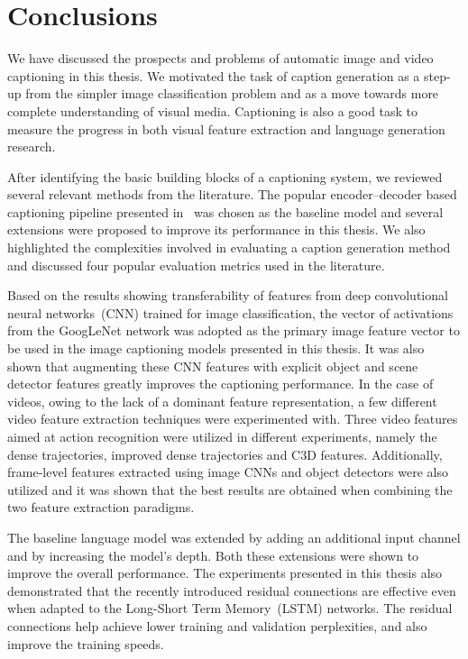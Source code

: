 \chapter{Conclusions}
\label{chapter:conclusions}

We have discussed the prospects and problems of automatic image and video
captioning in this thesis.
%
We motivated the task of caption generation as a step-up from the simpler image
classification problem and as a move towards more complete understanding of
visual media.
Captioning is also a good task to measure the progress in both visual feature
extraction and language generation research.

After identifying the basic building blocks of a captioning system, we reviewed
several relevant methods from the literature.
The popular encoder--decoder based captioning pipeline presented
in~\cite{Vinyals_2015_CVPR} was chosen as the baseline model and several
extensions were proposed to improve its performance in this thesis.
We also highlighted the complexities involved in evaluating a caption generation
method and discussed four popular evaluation metrics used in the literature.

Based on the results showing transferability of features from deep convolutional
neural networks~(CNN) trained for image classification, the vector of
activations from the GoogLeNet network was adopted as the primary image
feature vector to be used in the image captioning models presented in this
thesis.
It was also shown that augmenting these CNN features with explicit object and
scene detector features greatly improves the captioning performance.
In the case of videos, owing to the lack of a dominant feature representation,
a few different video feature extraction techniques were experimented with.
Three video features aimed at action recognition were utilized in different
experiments, namely the dense trajectories, improved dense trajectories and C3D
features.
Additionally, frame-level features extracted using image CNNs and object
detectors were also utilized and it was shown that the best results are obtained
when combining the two feature extraction paradigms.

The baseline language model was extended by adding an additional input channel
and by increasing the model's depth.
Both these extensions were shown to improve the overall performance.
The experiments presented in this thesis also demonstrated that the recently
introduced residual connections are effective even when adapted to the Long-Short
Term Memory~(LSTM) networks.
The residual connections help achieve lower training and validation
perplexities, and also improve the training speeds.

